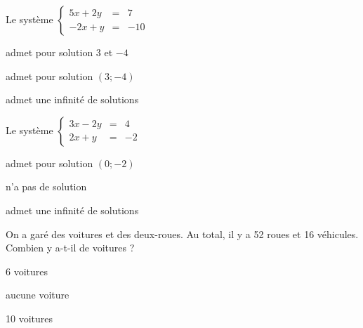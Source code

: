 \begin{QCM}
\begin{GroupeQCM}
  \begin{exercice}
      Le système 
      $\left\lbrace\begin{array}{lll}
	5x+2y&=& 7\\
	-2x+y&=& -10
	\end{array}\right.$
      \begin{ChoixQCM}{3}
      \item admet pour solution 3 et $-4$    
      \item admet pour solution $(3;-4)$
      \item admet une infinité de solutions
      \end{ChoixQCM}
\begin{corrige}
   \end{corrige}
    \end{exercice}

  \begin{exercice}
       Le système 
      $\left\lbrace\begin{array}{lll}
	3x-2y&=& 4\\
	2x+y&=& -2
	\end{array}\right.$
      \begin{ChoixQCM}{3}
     \item admet pour solution $(0;-2)$
      \item n'a pas de solution
      \item admet une infinité de solutions
      \end{ChoixQCM}
\begin{corrige}
   \end{corrige}
    \end{exercice}
    
  \begin{exercice}
      On a garé des voitures et des deux-roues. Au total, il y a 52 roues et 16 véhicules. Combien y a-t-il de voitures ?
      \begin{ChoixQCM}{3}
      \item 6 voitures
      \item aucune voiture
      \item 10 voitures
      \end{ChoixQCM}
\begin{corrige}
   \end{corrige}
    \end{exercice}
    

\end{GroupeQCM}
\end{QCM}

  